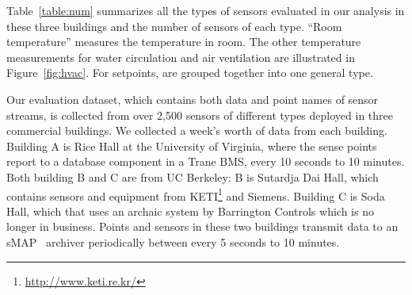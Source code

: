 Table~\ref{table:num} summarizes all the types of sensors evaluated in our analysis in these three buildings and the number of sensors of each type. 
``Room temperature'' measures the temperature in room. The other temperature measurements for water circulation and air ventilation are illustrated in Figure~\ref{fig:hvac}. 
For setpoints, are grouped together into
one general type. %

Our evaluation dataset, which contains both data and point names of sensor streams, is collected from over 2,500 sensors of different types deployed in three commercial buildings. 
We collected a week's worth of data from each building.
Building A is Rice Hall at the University of Virginia, where the sense points report to a database component in a Trane BMS, %
every 10 seconds to 10 minutes.
Both building B and C are from UC Berkeley: B is Sutardja Dai Hall, which contains sensors and equipment from KETI\footnote{\url{http://www.keti.re.kr/}} and Siemens. 
Building C is Soda Hall, which that uses an archaic system by Barrington Controls which is no longer in business. 
Points and sensors in these two buildings transmit data to an sMAP~\cite{smap} archiver periodically between every 5 seconds to 10 minutes.


